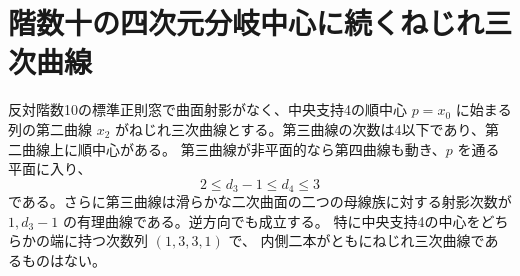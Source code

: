 \section{階数十の四次元分岐中心に続くねじれ三次曲線}
\label{sec:rank-ten-cubic-after-center}
\begin{theorem}\label{thm:rank-ten-cubic-after-center}
反対階数10の標準正則窓で曲面射影がなく、中央支持4の順中心 $p=x_0$ に始まる
列の第二曲線 $x_2$ がねじれ三次曲線とする。第三曲線の次数は4以下であり、第二曲線上に順中心がある。
第三曲線が非平面的なら第四曲線も動き、$p$ を通る平面に入り、
\[
             2\le d_3-1\le d_4\le3
\]
である。さらに第三曲線は滑らかな二次曲面の二つの母線族に対する射影次数が
$1,d_3-1$ の有理曲線である。逆方向でも成立する。
特に中央支持4の中心をどちらかの端に持つ次数列 $(1,3,3,1)$ で、
内側二本がともにねじれ三次曲線であるものはない。
\end{theorem}

